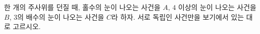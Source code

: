 한 개의 주사위를 던질 때, 홀수의 눈이 나오는 사건을 $A$, $4$ 이상의 눈이 나오는 사건을 $B$, $3$의 배수의 눈이 나오는 사건을 $C$라 하자. 서로 독립인 사건만을 보기에서 있는 대로 고르시오. 
